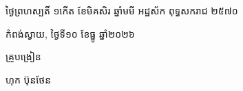 \documentclass[a4paper,10pt]{article}
\begin{document}
\vspace{6pt}
{\centering
\hspace*{5.2cm}\begin{minipage}{11.5cm}
  \centering
  ថ្ងៃព្រហស្បតិ៍ ១កើត ខែមិគសិរ ឆ្នាំមមី អដ្ឋស័ក ពុទ្ធសករាជ ២៥៧០\par
  កំពង់ស្វាយ, ថ្ងៃទី១០ ខែធ្នូ ឆ្នាំ២០២៦\par
  \vspace{2pt}
  {\muol គ្រូបង្រៀន\par}
  \vspace{32pt}
  \hfill{\muol ហុក ប៊ុនថែន}\hspace*{1.4cm}
\end{minipage}\par}
\end{document}
